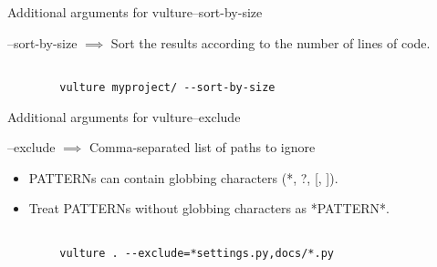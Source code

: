 \documentclass{beamer}
\begin{document}

\begin{frame}{Additional arguments for vulture}{--sort-by-size}

--sort-by-size \begin{math} \implies \end{math} Sort the results according to the number of lines of code.

\begin{example}
    \begin{verbatim}

        vulture myproject/ --sort-by-size

    \end{verbatim}

\end{example}
\end{frame}


\begin{frame}{Additional arguments for vulture}{--exclude}
    
--exclude \begin{math} \implies \end{math} Comma-separated list of paths to ignore 

\begin{itemize}
    \item
        PATTERNs can contain globbing
        characters (*, ?, [, ]).
    \item
        Treat PATTERNs without
        globbing characters as *PATTERN*.
\end{itemize}


\begin{example}
        \begin{verbatim}

        vulture . --exclude=*settings.py,docs/*.py

        \end{verbatim}
        
\end{example}
\end{frame}
\end{document}
